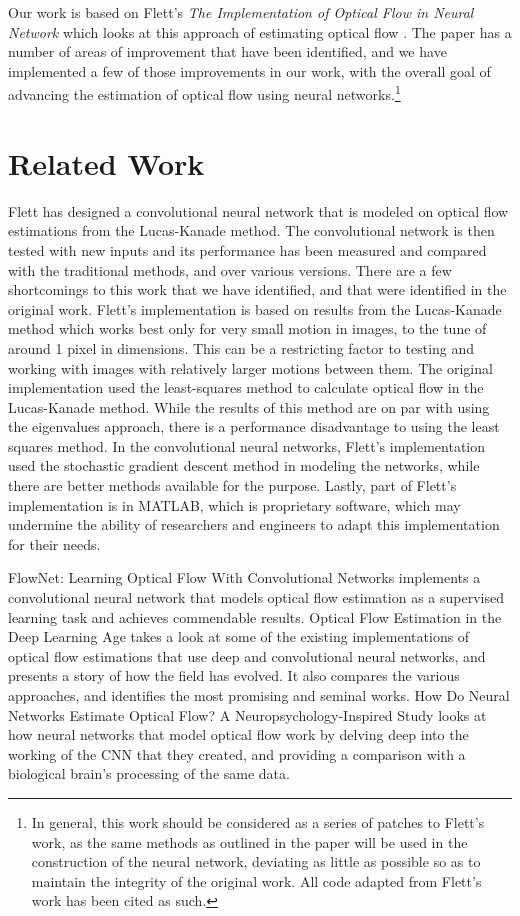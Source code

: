 \documentclass[]{article}
\begin{document}
Our work is based on Flett's \textit{The Implementation of Optical Flow in Neural Network} which looks at this approach of estimating optical flow \cite{flett}. 
The paper has a number of areas of improvement that have been identified, and we have implemented a few of those improvements in our work, with the overall goal of advancing the estimation of optical flow using neural networks.\footnote{In general, this work should be considered as a series of patches to Flett's work, as the same methods as outlined in the paper will be used in the construction of the neural network, deviating as little as possible so as to maintain the integrity of the original work.
All code adapted from Flett's work has been cited as such.}

\section{Related Work}\label{sec:related-work}
Flett has designed a convolutional neural network that is modeled on optical flow estimations from the Lucas-Kanade method. 
The convolutional network is then tested with new inputs and its performance has been measured and compared with the traditional methods, and over various versions. 
There are a few shortcomings to this work that we have identified, and that were identified in the original work. 
Flett's implementation is based on results from the Lucas-Kanade method which works best only for very small motion in images, to the tune of around 1 pixel in dimensions. 
This can be a restricting factor to testing and working with images with relatively larger motions between them. 
The original implementation used the least-squares method to calculate optical flow in the Lucas-Kanade method. 
While the results of this method are on par with using the eigenvalues approach, there is a performance disadvantage to using the least squares method.
In the convolutional neural networks, Flett's implementation used the stochastic gradient descent method in modeling the networks, while there are better methods available for the purpose. 
Lastly, part of Flett's implementation is in MATLAB, which is proprietary software, which may undermine the ability of researchers and engineers to adapt this implementation for their needs.\cite{flett}

FlowNet: Learning Optical Flow With Convolutional Networks \cite{fischer} implements a convolutional neural network that models optical flow estimation as a supervised learning task and achieves commendable results.  
Optical Flow Estimation in the Deep Learning Age \cite{roth} takes a look at some of the existing implementations of optical flow estimations that use deep and convolutional neural networks, and presents a story of how the field has evolved. It also compares the various approaches, and identifies the most promising and seminal works. 
How Do Neural Networks Estimate Optical Flow? A Neuropsychology-Inspired Study \cite{jong} looks at how neural networks that model optical flow work by delving deep into the working of the CNN that they created, and providing a comparison with a biological brain's processing of the same data. 
\end{document}
